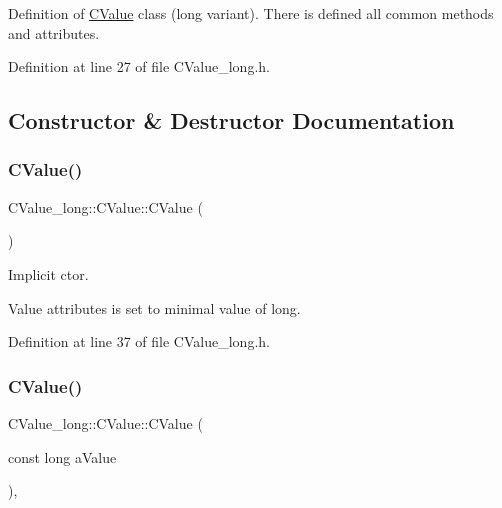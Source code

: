 Definition of \hyperlink{class_c_value__long_1_1_c_value}{C\+Value} class ({\ttfamily long} variant). There is defined all common methods and attributes. 

Definition at line 27 of file C\+Value\+\_\+long.\+h.



\subsection{Constructor \& Destructor Documentation}
\mbox{\label{class_c_value__long_1_1_c_value_a40c175a667125b6dc8faa84b0424ce4d}} 
\subsubsection{\texorpdfstring{C\+Value()}{CValue()}\hspace{0.1cm}{\footnotesize\ttfamily [1/4]}}
{\footnotesize\ttfamily C\+Value\+\_\+long\+::\+C\+Value\+::\+C\+Value (\begin{DoxyParamCaption}{ }\end{DoxyParamCaption})\hspace{0.3cm}{\ttfamily [inline]}}



Implicit c\textquotesingle{}tor. 

Value attributes is set to {\ttfamily minimal} value of long. 

Definition at line 37 of file C\+Value\+\_\+long.\+h.

\mbox{\label{class_c_value__long_1_1_c_value_a5c36e74c9d748c86e4061b38ac1749b7}} 
\subsubsection{\texorpdfstring{C\+Value()}{CValue()}\hspace{0.1cm}{\footnotesize\ttfamily [2/4]}}
{\footnotesize\ttfamily C\+Value\+\_\+long\+::\+C\+Value\+::\+C\+Value (\begin{DoxyParamCaption}\item[{const long}]{a\+Value }\end{DoxyParamCaption})\hspace{0.3cm}{\ttfamily [inline]}, {\ttfamily [explicit]}}



